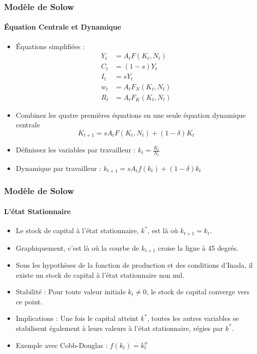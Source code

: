 \documentclass{beamer}
\begin{document}
\begin{frame}
    \frametitle{Modèle de Solow}
    \framesubtitle{Équation Centrale et Dynamique}
    \begin{itemize}
        \item Équations simplifiées :
        \begin{align*}
            Y_t &= A_t F(K_t, N_t) \\
            C_t &= (1 - s)Y_t \\
            I_t &= sY_t \\
            w_t &= A_t F_N(K_t, N_t) \\
            R_t &= A_t F_K(K_t, N_t)
        \end{align*}
        \item Combinez les quatre premières équations en une seule équation dynamique centrale
        \pause
        \[ K_{t+1} = sA_t F(K_t, N_t) + (1 - \delta)K_t \]
        \item Définissez les variables par travailleur : \( k_t = \frac{K_t}{N_t} \)
        \item Dynamique par travailleur : \( k_{t+1} = sA_t f(k_t) + (1 - \delta)k_t \)
    \end{itemize}
\end{frame}

\begin{frame}
    \frametitle{Modèle de Solow}
    \framesubtitle{L'état Stationnaire}
    \begin{itemize}
        \item Le stock de capital à l'état stationnaire, \( k^* \), est là où \( k_{t+1} = k_t \).
        \item Graphiquement, c'est là où la courbe de \( k_{t+1} \) croise la ligne à 45 degrés.
        \item Sous les hypothèses de la fonction de production et des conditions d'Inada, il existe un stock de capital à l'état stationnaire non nul.
        \item Stabilité : Pour toute valeur initiale \( k_t \neq 0 \), le stock de capital converge vers ce point.
        \item Implications : Une fois le capital atteint \( k^* \), toutes les autres variables se stabilisent également à leurs valeurs à l'état stationnaire, régies par \( k^* \).
        \item Exemple avec Cobb-Douglas : \( f(k_t) = k_t^\alpha \)
    \end{itemize}
\end{frame}
\end{document}

